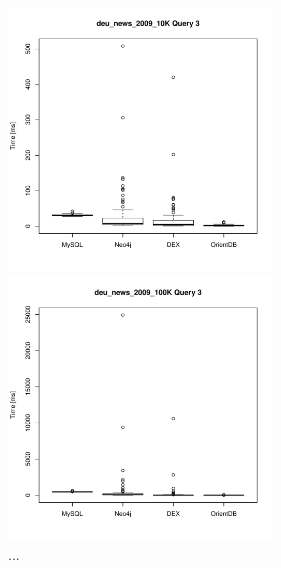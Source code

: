 \documentclass[11pt, a4paper, oneside]{article} %
\begin{document}
\begin{appendix}
\begin{figure}[ht]
\begin{minipage}[hbt]{7cm}
	\centering
	\includegraphics[width=7cm]{../results/cold caches/images/10K_query3_boxplot}
	\caption{...}
	\label{fig:10k_query3_boxplot}
\end{minipage}
\hfill
\begin{minipage}[hbt]{7cm}
	\centering
	\includegraphics[width=7cm]{../results/cold caches/images/100K_query3_boxplot}
	\caption{...}
	\label{fig:100k_query3_boxplot}
\end{minipage}
\end{figure}

\newpage
\thispagestyle{empty}


\end{appendix}
\end{document}
